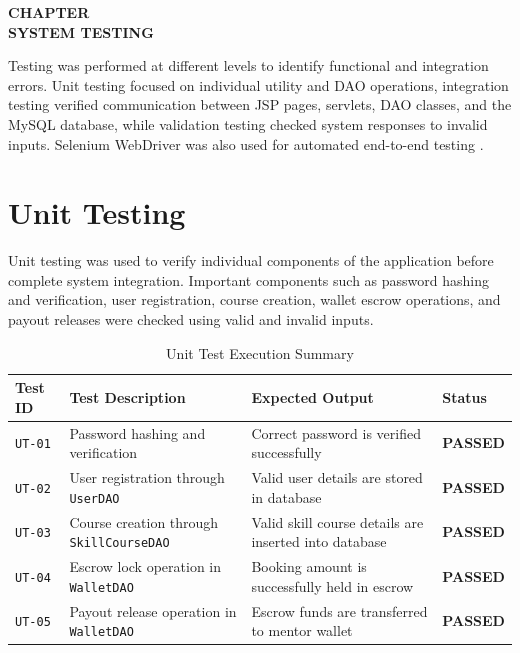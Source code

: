 \documentclass[12pt,a4paper]{report}
\newcommand{\chaptertitlepage}[1]{%
  \clearpage
  \thispagestyle{empty}
  \null
  \vfill
  \begin{center}
    {\fontsize{16pt}{18pt}\selectfont\bfseries CHAPTER \thechapter}\\[0.5cm]
    {\fontsize{16pt}{18pt}\selectfont\bfseries #1}
  \end{center}
  \vfill
  \null
  \clearpage
  \setcounter{section}{0}
}
\begin{document}
\chaptertitlepage{SYSTEM TESTING}

Testing was performed at different levels to identify functional and integration errors. Unit testing focused on individual utility and DAO operations, integration testing verified communication between JSP pages, servlets, DAO classes, and the MySQL database, while validation testing checked system responses to invalid inputs. Selenium WebDriver was also used for automated end-to-end testing \cite{seleniumref, pressman}.

\section{Unit Testing}
Unit testing was used to verify individual components of the application before complete system integration. Important components such as password hashing and verification, user registration, course creation, wallet escrow operations, and payout releases were checked using valid and invalid inputs.

\begin{table}[H]
\centering
\small
\caption{Unit Test Execution Summary}
\label{tab:unit_test_summary}
\begin{tabularx}{\textwidth}{|L{2.0cm}|L{4.0cm}|J|C{2.0cm}|}
\hline
\textbf{Test ID} & \textbf{Test Description} & \textbf{Expected Output} & \textbf{Status} \\ \hline
\texttt{UT-01} & Password hashing and verification & Correct password is verified successfully & \textbf{PASSED} \\ \hline
\texttt{UT-02} & User registration through \texttt{UserDAO} & Valid user details are stored in database & \textbf{PASSED} \\ \hline
\texttt{UT-03} & Course creation through \texttt{SkillCourseDAO} & Valid skill course details are inserted into database & \textbf{PASSED} \\ \hline
\texttt{UT-04} & Escrow lock operation in \texttt{WalletDAO} & Booking amount is successfully held in escrow & \textbf{PASSED} \\ \hline
\texttt{UT-05} & Payout release operation in \texttt{WalletDAO} & Escrow funds are transferred to mentor wallet & \textbf{PASSED} \\ \hline
\end{tabularx}
\end{table}
\end{document}
